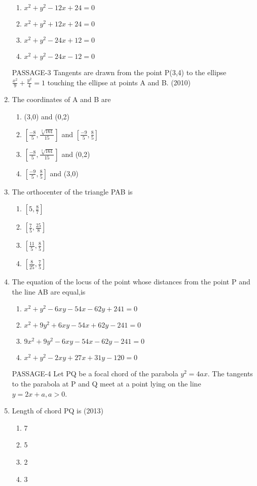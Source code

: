 \documentclass[12pt]{article}
\providecommand{\sbrak}[1]{\ensuremath{{}\left[#1\right]}}
\begin{document}
\begin{enumerate}
\begin{enumerate}
\item $x^2+y^2-12x+24=0$
\item $x^2+y^2+12x+24=0$
\item $x^2+y^2-24x+12=0$
\item $x^2+y^2-24x-12=0$
\end{enumerate}
PASSAGE-3
Tangents are drawn from the point P(3,4) to the ellipse $\frac{x^2}{9}+\frac{y^2}{4}=1$ touching the ellipse at points A and B. (2010)
\item The coordinates of A and B are
\begin{enumerate}
\item (3,0) and (0,2)
\item $\sbrak{\frac{-8}{5},\frac{\sqrt[2]{161}}{15}}$ and $\sbrak{\frac{-9}{5},\frac{8}{5}}$
\item $\sbrak{\frac{-8}{5},\frac{\sqrt[2]{161}}{15}}$ and (0,2)
\item $\sbrak{\frac{-9}{5},\frac{8}{5}}$ and (3,0)
\end{enumerate}
\item The orthocenter of the triangle PAB is
\begin{enumerate}
\item $\sbrak{5,\frac{8}{7}}$
\item $\sbrak{\frac{7}{5},\frac{25}{8}}$
\item $\sbrak{\frac{11}{5},\frac{8}{5}}$
\item $\sbrak{\frac{8}{25},\frac{7}{5}}$
\end{enumerate}
\item The equation of the locus of the point whose distances from the point P and the line AB are equal,is
\begin{enumerate}
\item $x^2+y^2-6xy-54x-62y+241=0$
\item $x^2+9y^2+6xy-54x+62y-241=0$
\item $9x^2+9y^2-6xy-54x-62y-241=0$
\item $x^2+y^2-2xy+27x+31y-120=0$
\end{enumerate}
PASSAGE-4
Let PQ be a focal chord of the parabola $y^2=4ax$. The tangents to the parabola at P and Q meet at a point lying on the line $y=2x+a,a>0$.
\item Length of chord PQ is (2013)
\begin{enumerate}
\item 7
\item 5
\item 2 
\item 3

\end{enumerate}
\end{enumerate}
\end{document}
